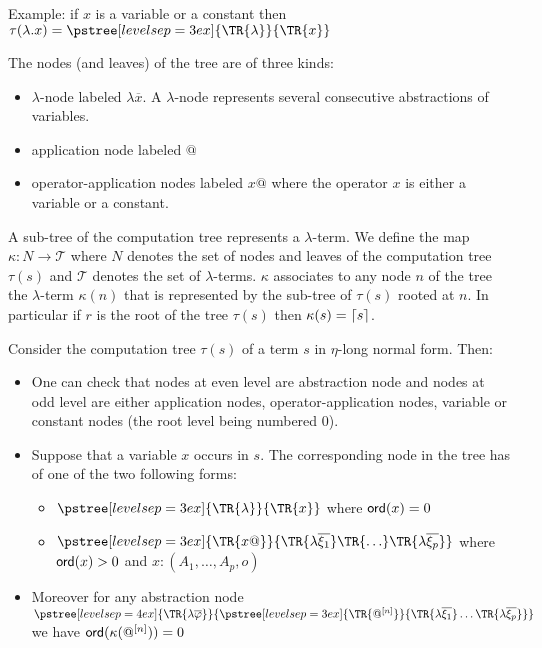 Example: if $x$ is a variable or a constant then
$ \cmptre{\lambda . x} =
  \pstree[levelsep=3ex]
    { \TR{\lambda } }
    { \TR{x}
    }$

The nodes (and leaves) of the tree are of three kinds:
\begin{itemize}
\item $\lambda$-node labeled $\lambda \overline{x}$. A $\lambda$-node represents several consecutive abstractions of variables.
\item application node labeled $@$
\item operator-application nodes labeled $x @$ where the operator $x$ is
either a variable or a constant.
\end{itemize}

A sub-tree of the computation tree represents a $\lambda$-term. We
define the map $\kappa : N \rightarrow \mathcal{T}$ where $N$
denotes the set of nodes and leaves of the computation tree
$\tau(s)$ and $\mathcal{T}$ denotes the set of $\lambda$-terms.
$\kappa$ associates to any node $n$ of the tree the $\lambda$-term
$\kappa(n)$ that is represented by the sub-tree of $\tau(s)$ rooted
at $n$. In particular if $r$ is the root of the tree $\tau(s)$ then
$\kappa(s) = \lceil s\rceil$.



Consider the computation tree $\tau(s)$ of a term $s$ in $\eta$-long normal form. Then:
\begin{itemize}
\item One can check that nodes at even level are abstraction
node and nodes at odd level are either application nodes,
operator-application nodes, variable or constant nodes (the root level being numbered $0$).

\item Suppose that a variable $x$ occurs in $s$. The corresponding node in the tree has of one of the two following forms:
    \begin{itemize}
    \item $ \pstree[levelsep=3ex]
        { \TR{\lambda } }
        { \TR{x}
        }$ where ${\sf ord}(x) = 0$

    \item $ \pstree[levelsep=3ex]
                { \TR{x @} }
                { \TR{\lambda \overline{\xi_1}} \TR{\ldots} \TR{\lambda \overline{\xi_p}}}
        $ where ${\sf ord}(x) > 0$ and $x:(A_1,\ldots,A_p,o)$
    \end{itemize}

\item    Moreover for any abstraction node
        $ \pstree[levelsep=4ex]
            { \TR{\lambda \overline{\varphi}} }
            { \pstree[levelsep=3ex]
                {\TR{@^{[n]}}}
                {\TR{\lambda \overline{\xi_1}} \ldots \TR{\lambda \overline{\xi_p}}}
            }
        $
    we have ${\sf ord}(\kappa(@^{[n]}))=0$

\end{itemize}

